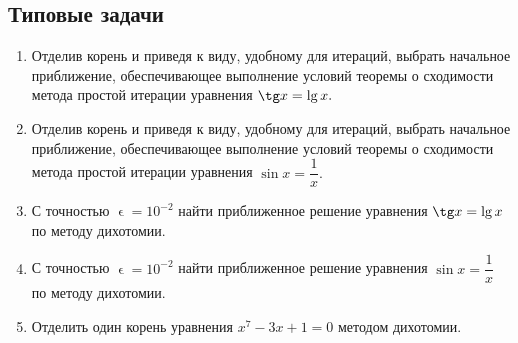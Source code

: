 \documentclass[a4paper, 12pt]{report}
\renewcommand{\epsilon}{\upvarepsilon}
\begin{document}
	\subsection{Типовые задачи}
	\begin{enumerate}
		\item Отделив корень и приведя к виду, удобному для итераций, выбрать начальное приближение, обеспечивающее выполнение условий теоремы о сходимости метода простой итерации уравнения $\tg x = \lg x.$
		\item Отделив корень и приведя к виду, удобному для итераций, выбрать начальное приближение, обеспечивающее выполнение условий теоремы о сходимости метода простой итерации уравнения $\sin x = \dfrac1x.$
		\item С точностью $\epsilon=10^{-2}$ найти приближенное решение уравнения $\tg x = \lg x$ по методу дихотомии.
		\item С точностью $\epsilon=10^{-2}$ найти приближенное решение уравнения $\sin x = \dfrac1x$ по методу дихотомии.
		\item Отделить один корень уравнения $x^7 - 3x + 1 = 0$ методом дихотомии.
	\end{enumerate}
\end{document}
